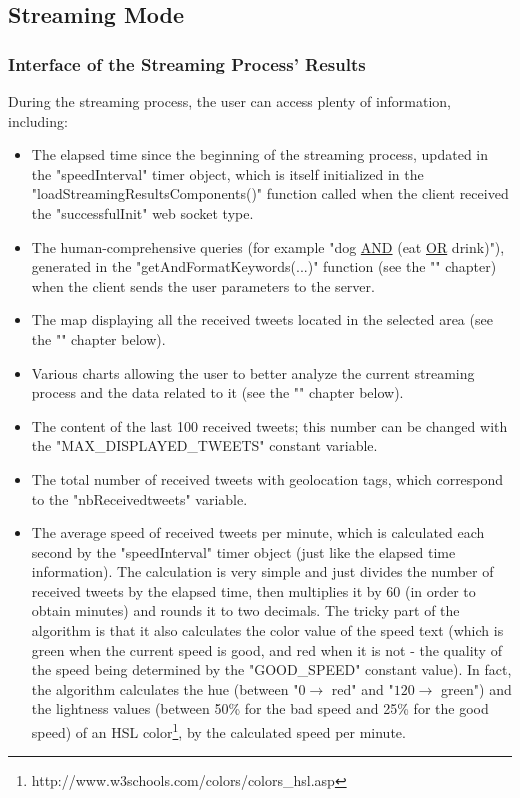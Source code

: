 \documentclass[a4paper,11pt]{report}
\begin{document}
\subsection{Streaming Mode}
\subsubsection{Interface of the Streaming Process' Results}
During the streaming process, the user can access plenty of information, including:
\begin{itemize}
	\item The elapsed time since the beginning of the streaming process, updated in the "speedInterval" timer object, which is itself initialized in the "loadStreamingResultsComponents()" function called when the client received the "successfulInit" web socket type.
	\item The human-comprehensive queries (for example "dog \underline{AND} (eat \underline{OR} drink)"), generated in the "getAndFormatKeywords(...)" function (see the "" chapter) when the client sends the user parameters to the server.
	\item The map displaying all the received tweets located in the selected area (see the "" chapter below).
	\item Various charts allowing the user to better analyze the current streaming process and the data related to it (see the "" chapter below).
	\item The content of the last 100 received tweets; this number can be changed with the "MAX\_DISPLAYED\_TWEETS" constant variable.
	\item The total number of received tweets with geolocation tags, which correspond to the "nbReceivedtweets" variable.
	\item The average speed of received tweets per minute, which is calculated each second by the "speedInterval" timer object (just like the elapsed time information). The calculation is very simple and just divides the number of received tweets by the elapsed time, then multiplies it by 60 (in order to obtain minutes) and rounds it to two decimals.
The tricky part of the algorithm is that it also calculates the color value of the speed text (which is green when the current speed is good, and red when it is not - the quality of the speed being determined by the "GOOD\_SPEED" constant value). In fact, the algorithm calculates the hue (between "$0\to$ red" and "$120\to$ green") and the lightness values (between 50\% for the bad speed and 25\% for the good speed) of an HSL color\footnote{http://www.w3schools.com/colors/colors\_hsl.asp}, by the calculated speed per minute.

\end{itemize}
\end{document}
